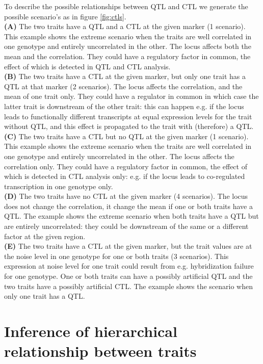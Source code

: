   To describe the possible relationships between QTL and CTL we generate the possible scenario's as in figure \ref{fig:ctls}.\\
  {\bf(A)} The two traits have a QTL and a CTL at the given marker (1 scenario). This example shows the extreme scenario when the traits are 
  well correlated in one genotype and entirely uncorrelated in the other. The locus affects both the mean and the correlation. They could 
  have a regulatory factor in common, the effect of which is detected in QTL and CTL analysis.\\
  {\bf(B)} The two traits have a CTL at the given marker, but only one trait has a QTL at that marker (2 scenarios).  The locus affects the 
  correlation, and the mean of one trait only. They could have a regulator in common in which case the latter trait is downstream of the other 
  trait: this can happen e.g. if the locus leads to functionally different transcripts at equal expression levels for the trait without QTL, 
  and this effect is propagated to the trait with (therefore) a QTL.\\
  {\bf(C)} The two traits have a CTL but no QTL at the given marker (1 scenario). This example shows the extreme scenario when the traits 
  are well correlated in one genotype and entirely uncorrelated in the other.  The locus affects the correlation only. They could have a 
  regulatory factor in common, the effect of which is detected in CTL analysis only: e.g. if the locus leads to co-regulated transcription 
  in one genotype only.\\
  {\bf(D)} The two traits have no CTL at the given marker  (4 scenarios).  The locus does not change the correlation, it change the mean 
  if one or both traits have a QTL. The example shows the extreme scenario when both traits have a QTL but are entirely uncorrelated: they 
  could be downstream of the same or a different factor at the given region.\\
  {\bf(E)} The two traits have a CTL at the given marker, but the trait values are at the noise level in one genotype for one or both 
  traits (3 scenarios). This expression at noise level for one trait could result from e.g. hybridization failure for one genotype. One 
  or both traits can have a possibly artificial QTL and the two traits have a possibly artificial CTL. The example shows the scenario 
  when only one trait has a QTL.

\section{Inference of hierarchical relationship between traits}
